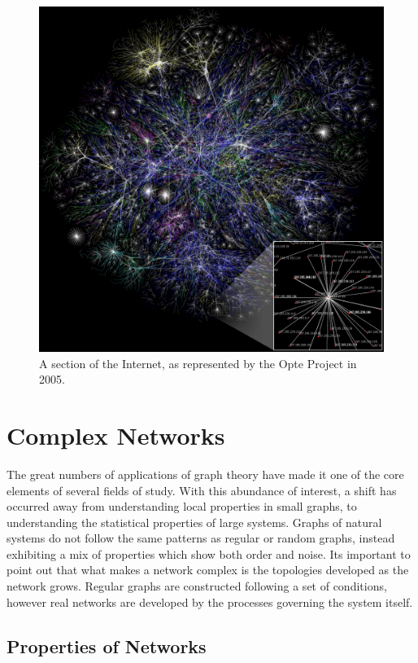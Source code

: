 \begin{figure}[!h]
	\title{}
	\begin{center}
		\includegraphics[scale=0.15]{images/Internet_map_1024.jpg}
	\end{center}
	\caption{A section of the Internet, as represented by the Opte Project in 2005.}
	\label{opte}
\end{figure}

\section{Complex Networks}
The great numbers of applications of graph theory have made it one of the core elements of several fields of study. With this abundance of interest, a shift has occurred away from understanding local properties in small graphs, to understanding the statistical properties of large systems. Graphs of natural systems do not follow the same patterns as regular or random graphs, instead exhibiting a mix of properties which show both order and noise. Its important to point out that what makes a network complex is the topologies developed as the network grows. Regular graphs are constructed following a set of conditions, however real networks are developed by the processes governing the system itself. 

\subsection{Properties of Networks}
